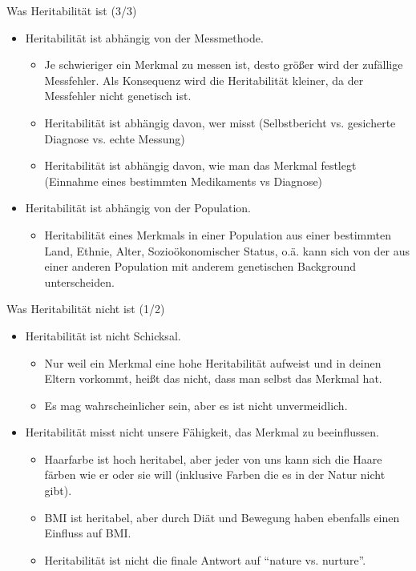 \documentclass{beamer}
\begin{document}
\begin{frame}{Was Heritabilität ist (3/3)}
    \begin{itemize}
        \item Heritabilität ist abhängig von der Messmethode.
        \begin{itemize}
            \item Je schwieriger ein Merkmal zu messen ist, desto größer wird der zufällige Messfehler. Als Konsequenz wird die Heritabilität kleiner, da der Messfehler nicht genetisch ist. 
            \item Heritabilität ist abhängig davon, wer misst (Selbstbericht vs. gesicherte Diagnose vs. echte Messung)
            \item Heritabilität ist abhängig davon, wie man das Merkmal festlegt (Einnahme eines bestimmten Medikaments vs Diagnose)
        \end{itemize}
        \item Heritabilität ist abhängig von der Population.
        \begin{itemize}
            \item Heritabilität eines Merkmals in einer Population aus einer bestimmten Land, Ethnie, Alter, Sozioökonomischer Status, o.ä. kann sich von der aus einer anderen Population mit anderem genetischen Background unterscheiden.
        \end{itemize}
    \end{itemize}
\end{frame}

\begin{frame}{Was Heritabilität nicht ist (1/2)}
\begin{itemize}
    \item Heritabilität ist nicht Schicksal. 
    \begin{itemize}
        \item Nur weil ein Merkmal eine hohe Heritabilität aufweist und in deinen Eltern vorkommt, heißt das nicht, dass man selbst das Merkmal hat. 
        \item Es mag wahrscheinlicher sein, aber es ist nicht unvermeidlich.
    \end{itemize}
    \item Heritabilität misst nicht unsere Fähigkeit, das Merkmal zu beeinflussen.
    \begin{itemize}
        \item Haarfarbe ist hoch heritabel, aber jeder von uns kann sich die Haare färben wie er oder sie will (inklusive Farben die es in der Natur nicht gibt).
        \item BMI ist heritabel, aber durch Diät und Bewegung haben ebenfalls einen Einfluss auf BMI.
        \item Heritabilität ist nicht die finale Antwort auf “nature vs. nurture”.
    \end{itemize}
\end{itemize}
\end{frame}
\end{document}
